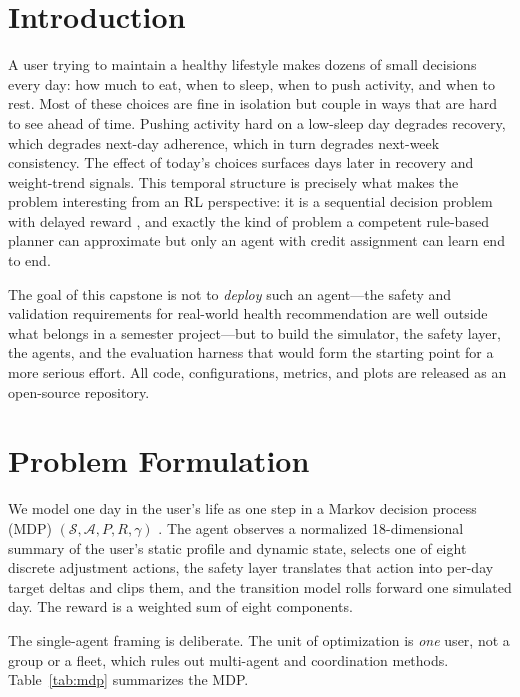 \documentclass[conference]{IEEEtran}
\begin{document}
\section{Introduction}
A user trying to maintain a healthy lifestyle makes dozens of small decisions
every day: how much to eat, when to sleep, when to push activity, and when to
rest. Most of these choices are fine in isolation but couple in ways that are
hard to see ahead of time. Pushing activity hard on a low-sleep day degrades
recovery, which degrades next-day adherence, which in turn degrades next-week
consistency. The effect of today's choices surfaces days later in recovery and
weight-trend signals. This temporal structure is precisely what makes the
problem interesting from an RL perspective: it is a sequential decision problem
with delayed reward \cite{sutton}, and exactly the kind of problem a competent
rule-based planner can approximate but only an agent with credit assignment can
learn end to end.

The goal of this capstone is not to \emph{deploy} such an agent---the safety
and validation requirements for real-world health recommendation are well
outside what belongs in a semester project---but to build the simulator, the
safety layer, the agents, and the evaluation harness that would form the
starting point for a more serious effort. All code, configurations, metrics,
and plots are released as an open-source repository.

\section{Problem Formulation}
We model one day in the user's life as one step in a Markov decision process
(MDP) $(\mathcal{S}, \mathcal{A}, P, R, \gamma)$ \cite{sutton}. The agent
observes a normalized 18-dimensional summary of the user's static profile and
dynamic state, selects one of eight discrete adjustment actions, the safety
layer translates that action into per-day target deltas and clips them, and the
transition model rolls forward one simulated day. The reward is a weighted sum
of eight components.

The single-agent framing is deliberate. The unit of optimization is
\emph{one} user, not a group or a fleet, which rules out multi-agent and
coordination methods. Table~\ref{tab:mdp} summarizes the MDP.
\end{document}
